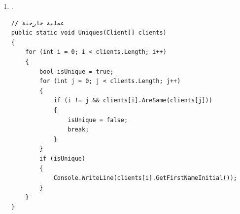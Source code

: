 \begin{boxSolution}
\begin{enumerate}[label=\alph*., resume]
    \item .
\begin{boxCode}
\begin{english}
\begin{verbatim}
// عملية خارجية
public static void Uniques(Client[] clients)
{
    for (int i = 0; i < clients.Length; i++)
    {
        bool isUnique = true;
        for (int j = 0; j < clients.Length; j++)
        {
            if (i != j && clients[i].AreSame(clients[j]))
            {
                isUnique = false;
                break;
            }
        }
        if (isUnique)
        {
            Console.WriteLine(clients[i].GetFirstNameInitial());
        }
    }
}
\end{verbatim}
\end{english}
\end{boxCode}

\end{enumerate}
\end{boxSolution}
\clearpage
\fi
